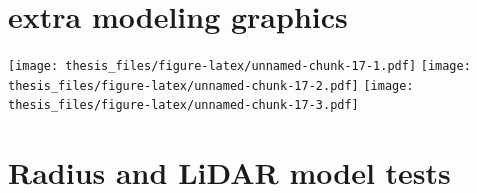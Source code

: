 \documentclass[12pt,twoside]{reedthesis}
\begin{document}
\hypertarget{extra-modeling-graphics}{%
\section*{extra modeling graphics}\label{extra-modeling-graphics}}

\texttt{[image: thesis\_files/figure-latex/unnamed-chunk-17-1.pdf]} \texttt{[image: thesis\_files/figure-latex/unnamed-chunk-17-2.pdf]} \texttt{[image: thesis\_files/figure-latex/unnamed-chunk-17-3.pdf]}

\hypertarget{radius-and-lidar-model-tests}{%
\section*{Radius and LiDAR model tests}\label{radius-and-lidar-model-tests}}
\end{document}
